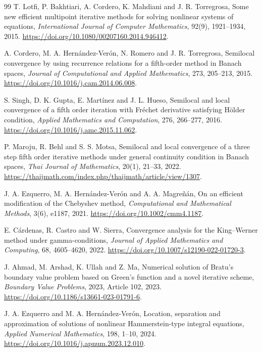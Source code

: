 \documentclass[11pt,a4paper]{article}
\numberwithin{equation}{section}
\numberwithin{table}{section}
\theoremstyle{plain}
\theoremstyle{definition}\newtheorem{definition}[theorem]{Definition}
\theoremstyle{remark}\newtheorem{remark}[theorem]{Remark}
\begin{document}
\begin{thebibliography}{99}
 T. Lotfi, P. Bakhtiari, A. Cordero, K. Mahdiani and J. R. Torregrosa, Some new efficient multipoint iterative methods for solving nonlinear systems of equations, \textit{International Journal of Computer Mathematics}, 92(9), 1921--1934, 2015. \url{https://doi.org/10.1080/00207160.2014.946412}.

 A. Cordero, M. A. Hern\'andez-Ver\'on, N. Romero and J. R. Torregrosa, Semilocal convergence by using recurrence relations for a fifth-order method in Banach spaces, \textit{Journal of Computational and Applied Mathematics}, 273, 205--213, 2015. \url{https://doi.org/10.1016/j.cam.2014.06.008}.

 S. Singh, D. K. Gupta, E. Mart\'inez and J. L. Hueso, Semilocal and local convergence of a fifth order iteration with Fr\'echet derivative satisfying H\"older condition, \textit{Applied Mathematics and Computation}, 276, 266--277, 2016. \url{https://doi.org/10.1016/j.amc.2015.11.062}.

 P. Maroju, R. Behl and S. S. Motsa, Semilocal and local convergence of a three step fifth order iterative methods under general continuity condition in Banach spaces, \textit{Thai Journal of Mathematics}, 20(1), 21--33, 2022. \url{https://thaijmath.com/index.php/thaijmath/article/view/1307}.

 J. A. Ezquerro, M. A. Hern\'andez-Ver\'on and A. A. Magre\~n\'an, On an efficient modification of the Chebyshev method, \textit{Computational and Mathematical Methods}, 3(6), e1187, 2021. \url{https://doi.org/10.1002/cmm4.1187}.

 E. C\'ardenas, R. Castro and W. Sierra, Convergence analysis for the King--Werner method under gamma-conditions, \textit{Journal of Applied Mathematics and Computing}, 68, 4605--4620, 2022. \url{https://doi.org/10.1007/s12190-022-01720-3}.

 J. Ahmad, M. Arshad, K. Ullah and Z. Ma, Numerical solution of Bratu's boundary value problem based on Green's function and a novel iterative scheme, \textit{Boundary Value Problems}, 2023, Article 102, 2023. \url{https://doi.org/10.1186/s13661-023-01791-6}.

 J. A. Ezquerro and M. A. Hern\'andez-Ver\'on, Location, separation and approximation of solutions of nonlinear Hammerstein-type integral equations, \textit{Applied Numerical Mathematics}, 198, 1--10, 2024. \url{https://doi.org/10.1016/j.apnum.2023.12.010}.


\end{thebibliography}
\end{document}
